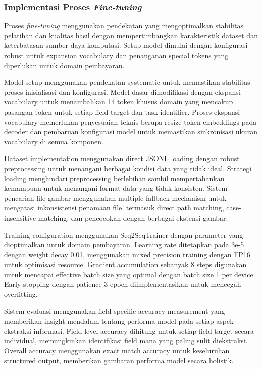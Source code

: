 \subsubsection{Implementasi Proses \emph{Fine-tuning}}
\label{subsubsec:implementasi-proses-fine-tuning}

Proses \emph{fine-tuning} menggunakan pendekatan yang mengoptimalkan stabilitas pelatihan dan kualitas hasil dengan mempertimbangkan karakteristik dataset dan keterbatasan sumber daya komputasi. Setup model dimulai dengan konfigurasi robust untuk expansion vocabulary dan penanganan special tokens yang diperlukan untuk domain pembayaran.

Model setup menggunakan pendekatan systematic untuk memastikan stabilitas proses inisialisasi dan konfigurasi. Model dasar \donutcord{} dimodifikasi dengan ekspansi vocabulary untuk menambahkan 14 token khusus domain yang mencakup pasangan token untuk setiap field target dan task identifier. Proses ekspansi vocabulary memerlukan penyesuaian teknis berupa resize token embeddings pada decoder dan pembaruan konfigurasi model untuk memastikan sinkronisasi ukuran vocabulary di semua komponen.

Dataset implementation menggunakan direct JSONL loading dengan robust preprocessing untuk menangani berbagai kondisi data yang tidak ideal. Strategi loading menghindari preprocessing berlebihan sambil mempertahankan kemampuan untuk menangani format data yang tidak konsisten. Sistem pencarian file gambar menggunakan multiple fallback mechanism untuk mengatasi inkonsistensi penamaan file, termasuk direct path matching, case-insensitive matching, dan pencocokan dengan berbagai ekstensi gambar.

Training configuration menggunakan Seq2SeqTrainer dengan parameter yang dioptimalkan untuk domain pembayaran. Learning rate ditetapkan pada 3e-5 dengan weight decay 0.01, menggunakan mixed precision training dengan FP16 untuk optimisasi resource. Gradient accumulation sebanyak 8 steps digunakan untuk mencapai effective batch size yang optimal dengan batch size 1 per device. Early stopping dengan patience 3 epoch diimplementasikan untuk mencegah overfitting.

Sistem evaluasi menggunakan field-specific accuracy measurement yang memberikan insight mendalam tentang performa model pada setiap aspek ekstraksi informasi. Field-level accuracy dihitung untuk setiap field target secara individual, memungkinkan identifikasi field mana yang paling sulit diekstraksi. Overall accuracy menggunakan exact match accuracy untuk keseluruhan structured output, memberikan gambaran performa model secara holistik.

